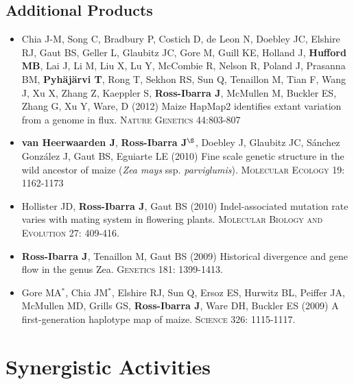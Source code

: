 \documentclass[11pt]{article}
\begin{document}
\subsection*{Additional Products}

\begin{itemize} \setlength{\itemsep}{0pt} \setlength{\parskip}{2pt} \setlength{\parsep}{0pt}

\item  Chia J-M, Song C, Bradbury P, Costich D, de Leon N, Doebley JC, Elshire RJ, Gaut BS, Geller L, Glaubitz JC, Gore M, Guill KE, Holland J,  {\bf Hufford MB}, Lai J, Li M, Liu X, Lu Y, McCombie R, Nelson R, Poland J, Prasanna BM,  {\bf Pyh\"aj\"arvi T}, Rong T, Sekhon RS,  Sun Q, Tenaillon M, Tian F, Wang J, Xu X, Zhang Z, Kaeppler S, {\bf Ross-Ibarra J}, McMullen M, Buckler ES, Zhang G, Xu Y, Ware, D (2012) Maize HapMap2 identifies extant variation from a genome in flux. \textsc{Nature Genetics} 44:803-807

\item {\bf van Heerwaarden J}, {\bf Ross-Ibarra J}$^\S$, Doebley J, Glaubitz JC, S\'{a}nchez Gonz\'{a}lez J, Gaut BS, Eguiarte LE (2010) Fine scale genetic structure in the wild ancestor of maize (\emph{Zea mays} ssp. \emph{parviglumis}).  \textsc{Molecular Ecology} 19: 1162-1173

\item Hollister JD, {\bf Ross-Ibarra J}, Gaut BS (2010) Indel-associated mutation rate varies with mating system in flowering plants.  \textsc{Molecular Biology and Evolution} 27: 409-416.

\item {\bf Ross-Ibarra J}, Tenaillon M, Gaut BS (2009) Historical divergence and gene flow in the genus Zea.  \textsc{Genetics} 181: 1399-1413.

\item Gore MA$^*$, Chia JM$^*$, Elshire RJ, Sun Q, Ersoz ES, Hurwitz BL, Peiffer JA, McMullen MD, Grills GS, {\bf Ross-Ibarra J}, Ware DH, Buckler ES (2009) A first-generation haplotype map of maize.  \textsc{Science 326}: 1115-1117.

\end{itemize}

\section{Synergistic Activities}
\end{document}
